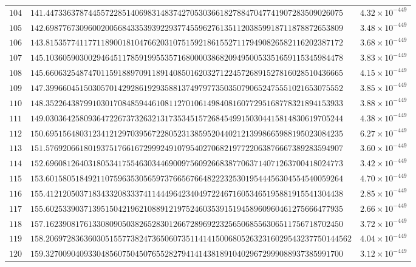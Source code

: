 \documentclass[12pt,reqno]{amsart}
\theoremstyle{remark}
\begin{document}
\begin{longtable}{clc}
$104$ & $141.4473363787445572285140698314837427053036618278847047741907283509026075$ & $4.32\times 10^{-449}$ \\
$105$ & $142.6987767309600200568433539392293774559627613511203859918711878872653809$ & $3.48\times 10^{-449}$ \\
$106$ & $143.8153577411771189001810476620310751592186155271179490826582116202387172$ & $3.68\times 10^{-449}$ \\
$107$ & $145.1036059030029464511785919955357168000038682094950053351659115345984478$ & $3.83\times 10^{-449}$ \\
$108$ & $145.6606325487470115918897091189140850162032712245726891527816028510436665$ & $4.15\times 10^{-449}$ \\
$109$ & $147.3996604515030570142928619293588137497977350350790652475551021653075552$ & $3.85\times 10^{-449}$ \\
$110$ & $148.3522643879910301708485944610811270106149840816077295168778321894153933$ & $3.88\times 10^{-449}$ \\
$111$ & $149.0303642580936472267373263213173534515726845499150304415814830619705244$ & $4.38\times 10^{-449}$ \\
$112$ & $150.6951564803123412129703956722805231385952044021213998665988195023084235$ & $6.27\times 10^{-449}$ \\
$113$ & $151.5769206618019375176616729992491079540270682197722063876667389283594907$ & $3.60\times 10^{-449}$ \\
$114$ & $152.6960812640318053417554630344690097560926683877063714071263700418024773$ & $3.42\times 10^{-449}$ \\
$115$ & $153.6015805184921107596353056597376656766482223253019544456304554540059264$ & $4.70\times 10^{-449}$ \\
$116$ & $155.4121205037183433208333741144496423404972246716053465195881915541304438$ & $2.85\times 10^{-449}$ \\
$117$ & $155.6025339037139515042196210889121975246035391519458960960461275666477935$ & $2.66\times 10^{-449}$ \\
$118$ & $157.1623908176133080905038265283012667289692232565068556306511756718702450$ & $3.72\times 10^{-449}$ \\
$119$ & $158.206972836360305155773824736506073511414150068052632316029543237750144562$ & $4.04\times 10^{-449}$ \\
$120$ & $159.3270090409330485607504507655282794141438189104029672999088937385991700$ & $3.12\times 10^{-449}$ \\

\end{longtable}
\end{document}
